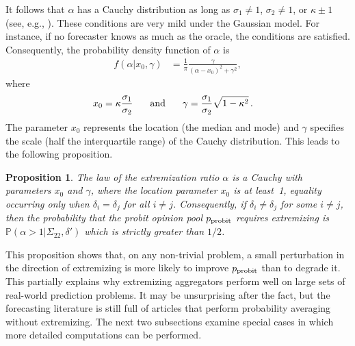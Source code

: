 \documentclass[11pt]{article}
\renewcommand{\P}{\mathbb{P}}
\newtheorem{proposition}[theorem]{Proposition}
\theoremstyle{definition}
\theoremstyle{definition}
\def\P{{\mathbb P}}
\def\probit{p_{\rm probit}}
\begin{document}
It follows that $\alpha$ has a Cauchy distribution as long as
$\sigma_1 \neq 1$, $\sigma_2 \neq 1$, or $\kappa \pm 1$ (see, e.g.,
\citealt{cedilnik2004distribution}).  These
conditions are very mild under the Gaussian model.
For instance, if no forecaster knows as much as the oracle, the
conditions are satisfied.  Consequently, the probability density
function of $\alpha$ is
\begin{align*}
f(\alpha | x_0, \gamma) &= \frac{1}{\pi} 
  \frac{\gamma}{(\alpha-x_0)^2+\gamma^2}, 
\end{align*}
where 
\begin{align*}
x_0 = \kappa \frac{\sigma_1}{\sigma_2} \hspace{0.2in} \mbox{ and } 
  \hspace{0.2in} \gamma &= \frac{\sigma_1}{\sigma_2} \sqrt{1-\kappa^2} \, .
\end{align*}
The parameter $x_0$ represents the location (the median and mode) and
$\gamma$ specifies the scale (half the interquartile range) of the
Cauchy distribution. This leads to the following proposition.  

\begin{proposition}
\label{positiveProbThm}
The law of the extremization ratio $\alpha$ is a Cauchy with
parameters $x_0$ and $\gamma$, where the location parameter $x_0$ is
at least~1, equality occurring only when $\delta_i = \delta_j$ for all
$i \neq j$. Consequently, if $\delta_i \neq \delta_j$ for some
$i \neq j$, then the probability that the probit opinion pool $\probit$
requires extremizing is $\P\left(\alpha > 1 | \Sigma_{22}, \delta'\right)$ which
is strictly greater than $1/2$.
\end{proposition}
\noindent
This proposition shows that, on any non-trivial problem, a small
perturbation in the direction of extremizing is more likely to improve
$\probit$ than to degrade it.  This partially explains
why extremizing aggregators perform well on large sets of real-world
prediction problems.  It may be unsurprising after the fact, but the
forecasting literature is still full of articles that perform
probability averaging without extremizing. The next two subsections examine special cases in which more detailed computations can be performed.

\end{document}
